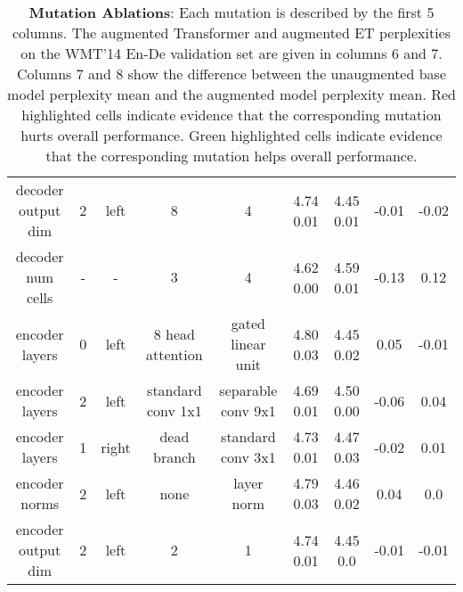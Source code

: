 \documentclass{article}
\begin{document}
\begin{table*}[ht]
\begin{center}
\begin{tiny}
\begin{sc}
\begin{tabular}{ccccccccc}
decoder output dim & 2 & left & 8 & 4 & 4.74  0.01 & 4.45  0.01 & \cellcolor{Green}-0.01 & \cellcolor{Red}-0.02 \\
decoder num cells & - & - & 3 & 4 & 4.62  0.00 & 4.59  0.01 & \cellcolor{Green}-0.13 & \cellcolor{Green} 0.12 \\
encoder layers & 0 & left & 8 head attention & gated linear unit & 4.80  0.03 & 4.45  0.02 & \cellcolor{Red} 0.05 & \cellcolor{Red} -0.01 \\
encoder layers & 2 & left & standard conv 1x1 & separable conv 9x1 & 4.69  0.01 & 4.50  0.00 & \cellcolor{Green} -0.06 & \cellcolor{Green} 0.04 \\
encoder layers & 1 & right & dead branch & standard conv 3x1 & 4.73  0.01 & 4.47  0.03 &  \cellcolor{Green}-0.02 & \cellcolor{Green}0.01 \\
encoder norms & 2 & left & none & layer norm & 4.79  0.03 & 4.46  0.02 & \cellcolor{Red} 0.04 & 0.0 \\
encoder output dim & 2 & left & 2 & 1 & 4.74  0.01 & 4.45  0.0 & \cellcolor{Green}-0.01 & \cellcolor{Red} -0.01 \\
\midrule
\bottomrule
\end{tabular}
\end{sc}
\end{tiny}
\end{center}
\caption{\textbf{Mutation Ablations}: Each mutation is described by the first 5 columns. The augmented Transformer and augmented ET perplexities on the WMT'14 En-De validation set are given in columns 6 and 7. Columns 7 and 8 show the difference between the unaugmented base model perplexity mean and the augmented model perplexity mean. Red highlighted cells indicate evidence that the corresponding mutation hurts overall performance. Green highlighted cells indicate evidence that the corresponding mutation helps overall performance.}
\label{tab:ablation}
\end{table*}
\end{document}
